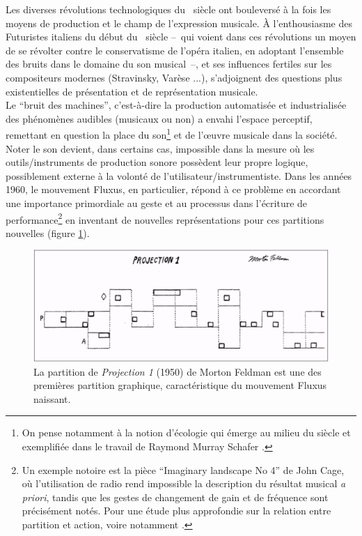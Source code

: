 \indent Les diverses révolutions technologiques du ~siècle ont bouleversé à la fois les moyens de production et le champ de l'expression musicale. À l'enthousiasme des Futuristes italiens du début du ~siècle --~qui voient dans ces révolutions un moyen de se révolter contre le conservatisme de l'opéra italien, en adoptant l'ensemble des bruits dans le domaine du son musical~--, et ses influences fertiles sur les compositeurs modernes (Stravinsky, Varèse ...), s'adjoignent des questions plus existentielles de présentation et de représentation musicale.\\
\indent Le ``bruit des machines'', c'est-à-dire la production automatisée et industrialisée des phénomènes audibles (musicaux ou non) a envahi l'espace perceptif, remettant en question la place du son\footnote{On pense notamment à la notion d'écologie qui émerge au milieu du siècle et exemplifiée dans le travail de Raymond Murray Schafer \cite{schafer_paysage_1979}.} et de l'œuvre musicale dans la société. Noter le son devient, dans certains cas, impossible dans la mesure où les outils/instruments de production sonore possèdent leur propre logique, possiblement externe à la volonté de l'utilisateur/instrumentiste. Dans les années 1960, le mouvement Fluxus, en particulier, répond à ce problème en accordant une importance primordiale au geste et au processus dans l'écriture de performance\footnote{Un exemple notoire est la pièce ``Imaginary landscape No 4'' de John Cage, où l'utilisation de radio rend impossible la description du résultat musical \textit{a priori}, tandis que les gestes de changement de gain et de fréquence sont précisément notés. Pour une étude plus approfondie sur la relation entre partition et action, voire notamment \cite{kojs_notating_2011}.} en inventant de nouvelles représentations pour ces partitions nouvelles (figure \ref{fig:notation:feldman}).\\
\begin{figure}[!htbp]
	\captionsetup{format=plain}
	\includegraphics[width=\textwidth]{gfx/notation/MortonFeldman-Projection1.png}
	\caption[La partition de \textit{Projection 1} de Morton Feldman]{La partition de \textit{Projection 1} (1950) de Morton Feldman est une des premières partition graphique, caractéristique du mouvement Fluxus naissant.}
	\label{fig:notation:feldman}
\end{figure}
